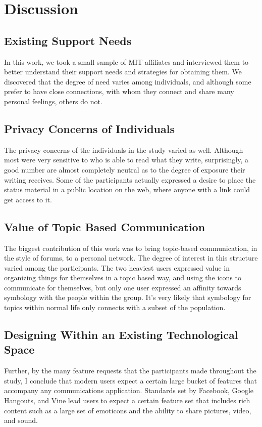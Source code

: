 \chapter{Discussion}
\section{Existing Support Needs}
	In this work, we took a small sample of MIT affiliates and interviewed
	them to better understand their support needs and strategies for
	obtaining them.
	We discovered that the degree of need varies among individuals,
	and although some prefer to have close connections,
	with whom they connect and share many personal feelings,
	others do not.

\section{Privacy Concerns of Individuals}
	The privacy concerns of the individuals in the study varied as well.
	Although most were very sensitive to who is able to read what they write,
	surprisingly, a good number are almost completely neutral as to the
	degree of exposure their writing receives.
	Some of the participants actually expressed a desire to place
	the status material in a public location on the web,
	where anyone with a link could get access to it.

\section{Value of Topic Based Communication}
	The biggest contribution of this work was to bring topic-based communication,
	in the style of forums, to a personal network.
	The degree of interest in this structure varied among the participants.
	The two heaviest users expressed value in organizing things for themselves
	in a topic based way, and using the icons to communicate for themselves,
	but only one user expressed an affinity towards symbology with the people
	within the group.
	It's very likely that symbology for topics within normal life only
	connects with a subset of the population.

\section{Designing Within an Existing Technological Space}
	Further, by the many feature requests that the participants made throughout
	the study, I conclude that modern users expect a certain
	large bucket of features that accompany any communications application.
	Standards set by Facebook, Google Hangouts, and Vine lead users to expect
	a certain feature set that includes rich content such as
	a large set of emoticons and the ability to share pictures, video, and sound.
  
